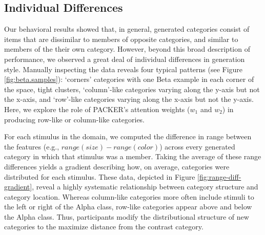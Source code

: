 \documentclass[10pt,letterpaper]{article}
\newcommand\inputpgf[2]{{
\let\pgfimageWithoutPath\pgfimage
\renewcommand{\pgfimage}[2][]{\pgfimageWithoutPath[##1]{#1/##2}}

}}
\begin{document}
\subsection{Individual Differences}
Our behavioral results showed that, in general, generated categories consist of items that are dissimilar to members of opposite categories, and similar to members of the their own category. However, beyond this broad description of performance, we observed a great deal of individual differences in generation style. Manually inspecting the data reveals four typical patterns (see Figure \ref{fig:beta.samples}): `corners' categories with one Beta example in each corner of the space, tight clusters, `column'-like categories varying along the y-axis but not the x-axis, and `row'-like categories varying along the x-axis but not the y-axis. Here, we explore the role of PACKER's attention weights ($w_1$ and $w_2$) in producing row-like or column-like categories.

\begin{figure*}
    \begin{center}
    \inputpgf{figs/}{range-diff-gradient.pgf}
    \caption{Generated category structure as a function of location. Orange areas in each gradient correspond to stimuli that were commonly generated into category possessing greater y-axis range (columns). Purple areas correspond to categories possessing greater x-axis range. White areas correspond to equal range along both features (or infrequent generation).}
    \label{fig:range-diff-gradient}
    \end{center}
\end{figure*}

For each stimulus in the domain, we computed the difference in range between the features (e.g., $range(size) - range(color)$) across every generated category in which that stimulus was a member. Taking the average of these range differences yields a gradient describing how, on average, categories were distributed for each stimulus. These data, depicted in Figure \ref{fig:range-diff-gradient}, reveal a highly systematic relationship between category structure and category location. Whereas column-like categories more often include stimuli to the left or right of the Alpha class, row-like categories appear above and below the Alpha class.  Thus, participants modify the distributional structure of new categories to the maximize distance from the contrast category.
\end{document}
